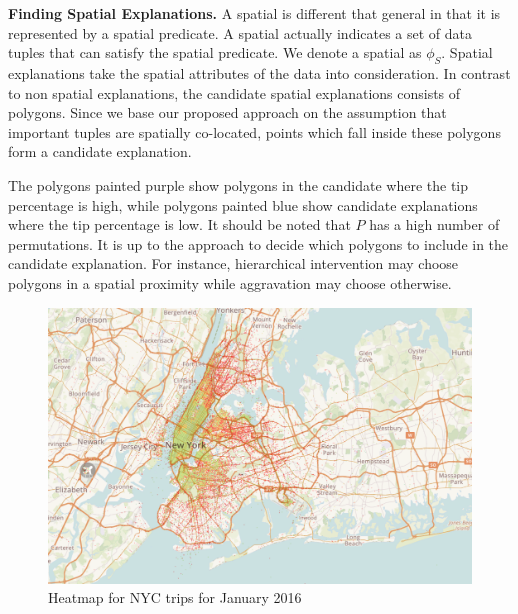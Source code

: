 {\bf Finding Spatial Explanations.}
A spatial {\explanation} is different that general {\explanation} in that it is represented by a spatial predicate. A spatial {\explanation} actually indicates a set of data tuples that can satisfy the spatial predicate. We denote a spatial {\explanation} as $\phi_S$.
Spatial explanations take the spatial attributes of the data into consideration. In contrast to non spatial explanations, the candidate spatial explanations consists of polygons. Since we base our proposed approach on the assumption that important tuples are spatially co-located, points which fall inside these polygons form a candidate explanation. 



The polygons painted purple show polygons in the candidate {\explanation} where the tip percentage is high, while polygons painted blue show candidate explanations where the tip percentage is low. It should be noted that $P$ has a high number of permutations. It is up to the approach to decide which polygons to include in the candidate explanation. For instance, hierarchical intervention may choose polygons in a spatial proximity while aggravation may choose otherwise.
\begin{figure}[t]
\includegraphics[width=\columnwidth]{images/scatter}
\caption{Heatmap for NYC trips for January 2016}
\label{fig:square_unit_grid}
\end{figure}

